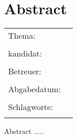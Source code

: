 \chapter*{Abstract}


\begin{center}
	\begingroup
	\renewcommand*{\arraystretch}{1}
	{\makeatletter	
		\begin{tabular}{p{3.2cm}p{9.6cm}}
			Thema: & \thema \\
			& \\
			\type kandidat: & \verfasser \\
			& \\
			Betreuer: & \hochschule \newline \institut \newline \prueferA \newline \prueferB \\
			& \\
			Abgabedatum: & \abgabedatum \\
			& \\
			Schlagworte: & \schlagworte \\
			& \\
		\end{tabular}
	
	\makeatother}
	\endgroup
\end{center}

\bigskip

\noindent
Abstract .....